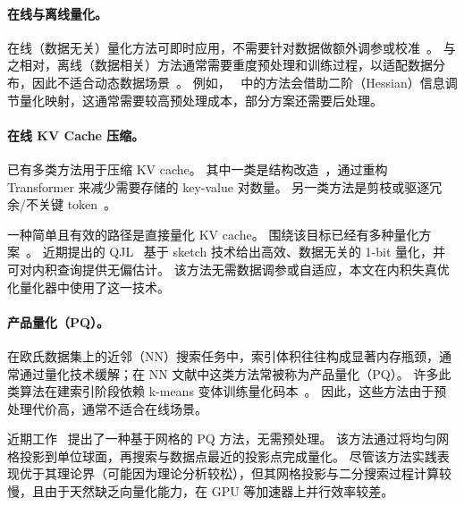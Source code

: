 \documentclass[11pt]{ctexart}
\begin{document}
\paragraph{在线与离线量化。}
在线（数据无关）量化方法可即时应用，不需要针对数据做额外调参或校准~\cite{dettmers2022gpt3, ashkboos2024quarot, liu2024kivi, shah2024flashattention, han2025polarquant}。
与之相对，离线（数据相关）方法通常需要重度预处理和训练过程，以适配数据分布，因此不适合动态数据场景~\cite{kim2023squeezellm}。
例如，~\cite{frantar2022gptq, lin2024awq, xiao2023smoothquant, chee2023quip} 中的方法会借助二阶（Hessian）信息调节量化映射，这通常需要较高预处理成本，部分方案还需要后处理。


\paragraph{在线 KV Cache 压缩。}

已有多类方法用于压缩 KV cache。
其中一类是结构改造~\cite{shazeer2019fast, ainslie2023gqa, dai2024deepseekmoe}，通过重构 Transformer 来减少需要存储的 key-value 对数量。
另一类方法是剪枝或驱逐冗余/不关键 token~\cite{beltagy2020longformer, zhang2024h2o, liu2024scissorhands, xiao2023efficient, zandieh2024subgen, li2024snapkv, han2025balancekv}。

一种简单且有效的路径是直接量化 KV cache。
围绕该目标已经有多种量化方案~\cite{yue2024wkvquant, yang2024no, dong2024qaq, kang2024gear, zhang2024kv, liu2024kivi, hooper2024kvquant, kim2024lexico, han2025polarquant}。
近期提出的 QJL~\cite{qjl} 基于 sketch 技术给出高效、数据无关的 1-bit 量化，并可对内积查询提供无偏估计。
该方法无需数据调参或自适应，本文在内积失真优化量化器中使用了这一技术。

\paragraph{产品量化（PQ）。}
在欧氏数据集上的近邻（NN）搜索任务中，索引体积往往构成显著内存瓶颈，通常通过量化技术缓解；在 NN 文献中这类方法常被称为产品量化（PQ）。
许多此类算法在建索引阶段依赖 k-means 变体训练量化码本~\cite{jegou2010product, babenko2014additive, ge2013optimized, wang2017survey, guo2020accelerating}。
因此，这些方法由于预处理代价高，通常不适合在线场景。

近期工作~\cite{gao2024practical} 提出了一种基于网格的 PQ 方法，无需预处理。
该方法通过将均匀网格投影到单位球面，再搜索与数据点最近的投影点完成量化。
尽管该方法实践表现优于其理论界（可能因为理论分析较松），但其网格投影与二分搜索过程计算较慢，且由于天然缺乏向量化能力，在 GPU 等加速器上并行效率较差。
\end{document}
